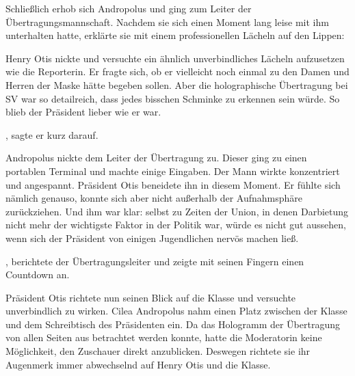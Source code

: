 \par

Schließlich erhob sich Andropolus und ging zum Leiter der Übertragungsmannschaft. Nachdem sie sich einen Moment lang leise mit ihm unterhalten hatte, erklärte sie mit einem professionellen Lächeln auf den Lippen: 

\par

Henry Otis nickte und versuchte ein ähnlich unverbindliches Lächeln aufzusetzen wie die Reporterin. Er fragte sich, ob er vielleicht noch einmal zu den Damen und Herren der Maske hätte begeben sollen. Aber die holographische Übertragung bei SV war so detailreich, dass jedes bisschen Schminke zu erkennen sein würde. So blieb der Präsident lieber wie er war.

\par

, sagte er kurz darauf.

\par

Andropolus nickte dem Leiter der Übertragung zu. Dieser ging zu einen portablen Terminal und machte einige Eingaben. Der Mann wirkte konzentriert und angespannt. Präsident Otis beneidete ihn in diesem Moment. Er fühlte sich nämlich genauso, konnte sich aber nicht außerhalb der Aufnahmsphäre zurückziehen. Und ihm war klar: selbst zu Zeiten der Union, in denen Darbietung nicht mehr der wichtigste Faktor in der Politik war, würde es nicht gut aussehen, wenn sich der Präsident von einigen Jugendlichen nervös machen ließ.

\par

, berichtete der Übertragungsleiter und zeigte mit seinen Fingern einen Countdown an.

\par

Präsident Otis richtete nun seinen Blick auf die Klasse und versuchte unverbindlich zu wirken. Cilea Andropolus nahm einen Platz zwischen der Klasse und dem Schreibtisch des Präsidenten ein. Da das Hologramm der Übertragung von allen Seiten aus betrachtet werden konnte, hatte die Moderatorin keine Möglichkeit, den Zuschauer direkt anzublicken. Deswegen richtete sie ihr Augenmerk immer abwechselnd auf Henry Otis und die Klasse.

\par

